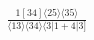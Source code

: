 \documentclass[varwidth, border=5pt]{standalone}
\begin{document}
\begin{my}
$\begin{gathered}
\scriptscriptstyle\frac{1[34]⟨25⟩⟨35⟩}{⟨13⟩⟨34⟩⟨3|1+4|3]}
\end{gathered}$
\end{my}
\end{document}
